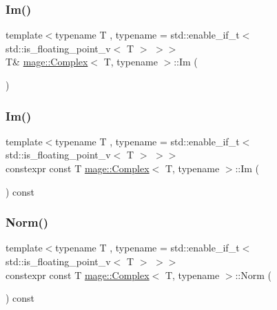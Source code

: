 \mbox{\label{structmage_1_1_complex_a93dcc9fef5216840b37932a17e62c742}} 
\subsubsection{\texorpdfstring{Im()}{Im()}\hspace{0.1cm}{\footnotesize\ttfamily [1/2]}}
{\footnotesize\ttfamily template$<$typename T , typename  = std\+::enable\+\_\+if\+\_\+t$<$ std\+::is\+\_\+floating\+\_\+point\+\_\+v$<$ T $>$ $>$$>$ \\
T\& \mbox{\hyperlink{structmage_1_1_complex}{mage\+::\+Complex}}$<$ T, typename $>$\+::Im (\begin{DoxyParamCaption}{ }\end{DoxyParamCaption})\hspace{0.3cm}{\ttfamily [noexcept]}}

\mbox{\label{structmage_1_1_complex_a32b35d2008d4942241c9d6c1c859101d}} 
\subsubsection{\texorpdfstring{Im()}{Im()}\hspace{0.1cm}{\footnotesize\ttfamily [2/2]}}
{\footnotesize\ttfamily template$<$typename T , typename  = std\+::enable\+\_\+if\+\_\+t$<$ std\+::is\+\_\+floating\+\_\+point\+\_\+v$<$ T $>$ $>$$>$ \\
constexpr const T \mbox{\hyperlink{structmage_1_1_complex}{mage\+::\+Complex}}$<$ T, typename $>$\+::Im (\begin{DoxyParamCaption}{ }\end{DoxyParamCaption}) const\hspace{0.3cm}{\ttfamily [noexcept]}}

\mbox{\label{structmage_1_1_complex_aa88a54350f311e9744a70d3b70209e96}} 
\subsubsection{\texorpdfstring{Norm()}{Norm()}}
{\footnotesize\ttfamily template$<$typename T , typename  = std\+::enable\+\_\+if\+\_\+t$<$ std\+::is\+\_\+floating\+\_\+point\+\_\+v$<$ T $>$ $>$$>$ \\
constexpr const T \mbox{\hyperlink{structmage_1_1_complex}{mage\+::\+Complex}}$<$ T, typename $>$\+::Norm (\begin{DoxyParamCaption}{ }\end{DoxyParamCaption}) const\hspace{0.3cm}{\ttfamily [noexcept]}}

